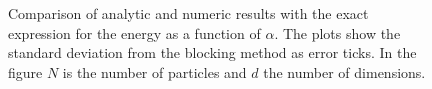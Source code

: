 \documentclass[
    a4paper, aps, twocolumn, floatfix, superscriptaddress, nofootinbib]{revtex4-1}
\newcommand{\1}{\mathds{1}}
\begin{document}
    \begin{figure}
        \caption{Comparison of analytic and numeric results with the exact
        expression for the energy as a function of $\alpha$. The plots show the
        standard deviation from the blocking method as error ticks. In the
        figure $N$ is the number of particles and $d$ the number of dimensions.}
        \label{fig:initial_problem_b}
    \end{figure}
\end{document}
